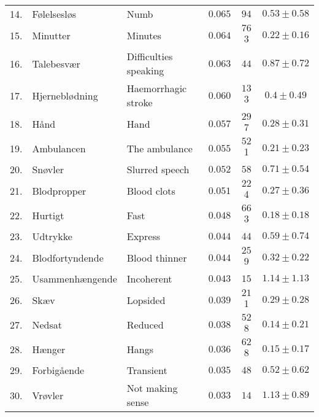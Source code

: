 {\begin{table}[h]
{\begin{tabular}{l|llccc}
        14. & Følelsesløs & Numb & $0.065$ & $94$ & $0.53 \pm 0.58$ \\
        15. & Minutter & Minutes & $0.064$ & $76$3 & $0.22 \pm 0.16$ \\
        16. & Talebesvær & Difficulties speaking & $0.063$ & $44$ & $0.87 \pm 0.72$ \\
        17. & Hjerneblødning & Haemorrhagic stroke & $0.060$ & $13$3 & $0.4 \pm 0.49$ \\
        18. & Hånd & Hand & $0.057$ & $29$7 & $0.28 \pm 0.31$ \\
        19. & Ambulancen & The ambulance & $0.055$ & $52$1 & $0.21 \pm 0.23$ \\
        20. & Snøvler & Slurred speech & $0.052$ & $58$ & $0.71 \pm 0.54$ \\
        21. & Blodpropper & Blood clots & $0.051$ & $22$4 & $0.27 \pm 0.36$ \\
        22. & Hurtigt & Fast & $0.048$ & $66$3 & $0.18 \pm 0.18$ \\
        23. & Udtrykke & Express & $0.044$ & $44$ & $0.59 \pm 0.74$ \\
        24. & Blodfortyndende & Blood thinner & $0.044$ & $25$9 & $0.32 \pm 0.22$ \\
        25. & Usammenhængende & Incoherent & $0.043$ & $15$ & $1.14 \pm 1.13$ \\
        26. & Skæv & Lopsided & $0.039$ & $21$1 & $0.29 \pm 0.28$ \\
        27. & Nedsat & Reduced & $0.038$ & $52$8 & $0.14 \pm 0.21$ \\
        28. & Hænger & Hangs & $0.036$ & $62$8 & $0.15 \pm 0.17$ \\
        29. & Forbigående & Transient & $0.035$ & $48$ & $0.52 \pm 0.62$ \\
        30. & Vrøvler & Not making sense & $0.033$ & $14$ & $1.13 \pm 0.89$ \\
        \bottomrule
    \end{tabular}%
    }
\end{table}

}
